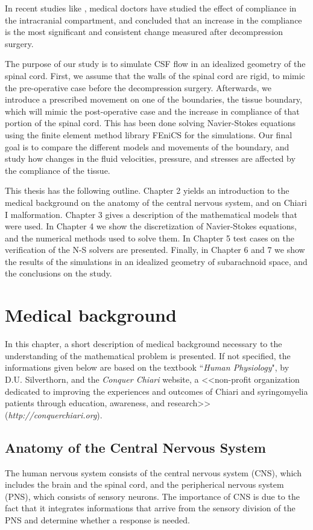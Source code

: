 \documentclass[a4paper,11pt,openright,twoside]{book}
\begin{document}
In recent studies like \cite{sivarama}, medical doctors have studied the effect of compliance in the intracranial compartment, and concluded that an increase in the compliance is the most significant and consistent change measured after decompression surgery. 

The purpose of our study is to simulate CSF flow in an idealized geometry of the spinal cord. First, we assume that the walls of the spinal cord are rigid, to mimic the pre-operative case before the decompression surgery.  Afterwards, we introduce a prescribed movement on one of the boundaries, the tissue boundary, which will mimic the post-operative case and the increase in compliance of that portion of the spinal cord. This has been done solving Navier-Stokes equations using the finite element method library FEniCS for the simulations. Our final goal is to compare the different models and movements of the boundary, and study how changes in the fluid velocities, pressure, and stresses are affected by the compliance of the tissue. 

This thesis has the following outline. Chapter 2 yields an introduction to the medical background on the anatomy of the central nervous system, and on Chiari I malformation. Chapter 3 gives a description of the mathematical models that were used. In Chapter 4 we show the discretization of Navier-Stokes equations, and the numerical methods used to solve them. In Chapter 5 test cases on the verification of the N-S solvers are presented. Finally, in Chapter 6 and 7 we show the results of the simulations in an idealized geometry of subarachnoid space, and the conclusions on the study.

\chapter{Medical background}
In this chapter, a short description of medical background necessary to the understanding of the mathematical problem is presented. If not specified, the informations given below are based on the textbook ``\emph{Human Physiology}", by D.U. Silverthorn, and the \emph{Conquer Chiari} website, a <<non-profit organization dedicated to improving the experiences and outcomes of Chiari and syringomyelia patients through education, awareness, and research>>  (\emph{http://conquerchiari.org}).

\section{Anatomy of the Central Nervous System}
The human nervous system consists of the central nervous system (CNS), which includes the brain and the spinal cord, and the peripherical nervous system (PNS), which consists of sensory neurons.  The importance of CNS is due to the fact that it integrates informations that arrive from the sensory division of the PNS and determine whether a response is needed. 
\end{document}
